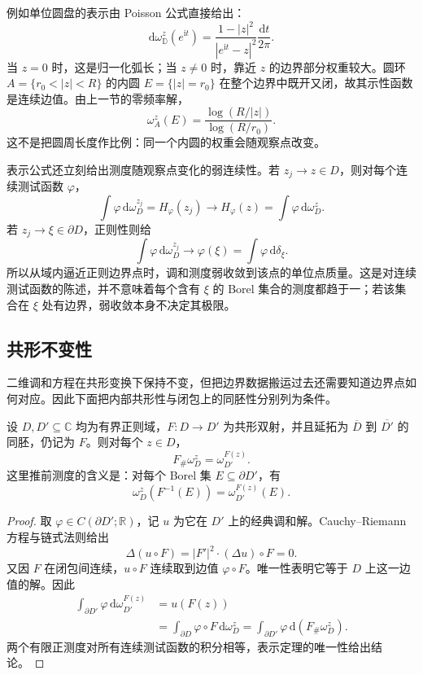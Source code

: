 \ProseParagraphBreak
例如单位圆盘的表示由 Poisson 公式直接给出：
\begin{equation}\label{b3:eq:16-disk-harmonic-measure}
 \mathrm d\omega_{\mathbb D}^z(e^{\mathrm it})
 =\frac{1-|z|^2}{|e^{\mathrm it}-z|^2}\frac{\mathrm dt}{2\pi}.
\end{equation}
当 \(z=0\) 时，这是归一化弧长；当 \(z\ne0\) 时，靠近 \(z\) 的边界部分权重较大。圆环 \(A=\{r_0<|z|<R\}\) 的内圆 \(E=\{|z|=r_0\}\) 在整个边界中既开又闭，故其示性函数是连续边值。由上一节的零频率解，
\[
 \omega_A^z(E)=\frac{\log(R/|z|)}{\log(R/r_0)}.
\]
这不是把圆周长度作比例：同一个内圆的权重会随观察点改变。

\ProseParagraphBreak
表示公式还立刻给出测度随观察点变化的弱连续性。若 \(z_j\to z\in D\)，则对每个连续测试函数 \(\varphi\)，
\[
 \int\varphi\,\mathrm d\omega_D^{z_j}
 =H_\varphi(z_j)\longrightarrow H_\varphi(z)
 =\int\varphi\,\mathrm d\omega_D^z.
\]
若 \(z_j\to\xi\in\partial D\)，正则性则给
\[
 \int\varphi\,\mathrm d\omega_D^{z_j}\longrightarrow\varphi(\xi)
 =\int\varphi\,\mathrm d\delta_\xi.
\]
所以从域内逼近正则边界点时，调和测度弱收敛到该点的单位点质量。这是对连续测试函数的陈述，并不意味着每个含有 \(\xi\) 的 Borel 集合的测度都趋于一；若该集合在 \(\xi\) 处有边界，弱收敛本身不决定其极限。

\subsection{共形不变性}
\label{b3:subsec:160402}

二维调和方程在共形变换下保持不变，但把边界数据搬运过去还需要知道边界点如何对应。因此下面把内部共形性与闭包上的同胚性分别列为条件。

\begin{proposition}[调和测度的共形不变性]\label{b3:prop:16-harmonic-measure-conformal}
设 \(D,D'\subseteq\mathbb C\) 均为有界正则域，\(F:D\to D'\) 为共形双射，并且延拓为 \(\overline D\) 到 \(\overline{D'}\) 的同胚，仍记为 \(F\)。则对每个 \(z\in D\)，
\[
 F_\#\omega_D^z=\omega_{D'}^{F(z)}.
\]
这里推前测度的含义是：对每个 Borel 集 \(E\subseteq\partial D'\)，有
\[
 \omega_D^z(F^{-1}(E))=\omega_{D'}^{F(z)}(E).
\]
\end{proposition}
\begin{proof}
取 \(\varphi\in C(\partial D';\mathbb R)\)，记 \(u\) 为它在 \(D'\) 上的经典调和解。Cauchy--Riemann 方程与链式法则给出
\[
 \Delta(u\circ F)=|F'|^2\cdot(\Delta u)\circ F=0.
\]
又因 \(F\) 在闭包间连续，\(u\circ F\) 连续取到边值 \(\varphi\circ F\)。唯一性表明它等于 \(D\) 上这一边值的解。因此
\[
 \begin{aligned}
 \int_{\partial D'}\varphi\,\mathrm d\omega_{D'}^{F(z)}
 &=u(F(z))\\
 &=\int_{\partial D}\varphi\circ F\,\mathrm d\omega_D^z
 =\int_{\partial D'}\varphi\,\mathrm d(F_\#\omega_D^z).
 \end{aligned}
\]
两个有限正测度对所有连续测试函数的积分相等，表示定理的唯一性给出结论。
\end{proof}

